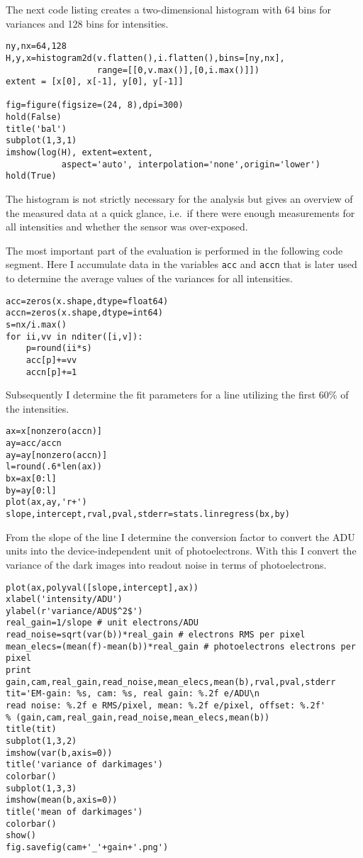 The next code listing creates a two-dimensional histogram with 64 bins
for variances and 128 bins for intensities.
\begin{lstlisting}[style=mypython]
ny,nx=64,128
H,y,x=histogram2d(v.flatten(),i.flatten(),bins=[ny,nx],
                  range=[[0,v.max()],[0,i.max()]])
extent = [x[0], x[-1], y[0], y[-1]] 

fig=figure(figsize=(24, 8),dpi=300)
hold(False)
title('bal')
subplot(1,3,1)
imshow(log(H), extent=extent,
           aspect='auto', interpolation='none',origin='lower')
hold(True)
\end{lstlisting}
The histogram is not strictly necessary for the analysis but gives an
overview of the measured data at a quick glance, i.e.\ if there were
enough measurements for all intensities and whether the sensor was
over-exposed.

The most important part of the evaluation is performed in the
following code segment. Here I accumulate data in the variables
\verb!acc! and \verb!accn! that is later used to determine the average
values of the variances for all intensities.
\begin{lstlisting}[style=mypython]
acc=zeros(x.shape,dtype=float64)
accn=zeros(x.shape,dtype=int64)
s=nx/i.max()
for ii,vv in nditer([i,v]):
    p=round(ii*s)
    acc[p]+=vv
    accn[p]+=1   
\end{lstlisting}
Subsequently I determine the fit parameters for a line utilizing the
first 60\% of the intensities.
\begin{lstlisting}[style=mypython]
ax=x[nonzero(accn)]
ay=acc/accn
ay=ay[nonzero(accn)]
l=round(.6*len(ax))
bx=ax[0:l]
by=ay[0:l]
plot(ax,ay,'r+')
slope,intercept,rval,pval,stderr=stats.linregress(bx,by)
\end{lstlisting}
From the slope of the line I determine the conversion factor to
convert the ADU units into the device-independent unit of
photoelectrons. With this I convert the variance of the dark images
into readout noise in terms of photoelectrons.
\begin{lstlisting}[style=mypython]
plot(ax,polyval([slope,intercept],ax))
xlabel('intensity/ADU')
ylabel(r'variance/ADU$^2$')
real_gain=1/slope # unit electrons/ADU
read_noise=sqrt(var(b))*real_gain # electrons RMS per pixel
mean_elecs=(mean(f)-mean(b))*real_gain # photoelectrons electrons per pixel
print gain,cam,real_gain,read_noise,mean_elecs,mean(b),rval,pval,stderr
tit='EM-gain: %s, cam: %s, real gain: %.2f e/ADU\n
read noise: %.2f e RMS/pixel, mean: %.2f e/pixel, offset: %.2f'
% (gain,cam,real_gain,read_noise,mean_elecs,mean(b))
title(tit)
subplot(1,3,2)
imshow(var(b,axis=0))
title('variance of darkimages')
colorbar()
subplot(1,3,3)
imshow(mean(b,axis=0))
title('mean of darkimages')
colorbar()
show()
fig.savefig(cam+'_'+gain+'.png')
\end{lstlisting}


